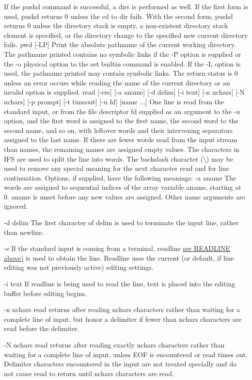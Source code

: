 If the pushd command is successful, a dirs is performed as well. If the first form is used, pushd returns 0 unless the cd to dir fails. With the second form, pushd returns 0 unless the directory stack is empty, a non-existent directory stack element is specified, or the directory change to the specified new current directory fails.
pwd [-LP]
Print the absolute pathname of the current working directory. The pathname printed contains no symbolic links if the -P option is supplied or the -o physical option to the set builtin command is enabled. If the -L option is used, the pathname printed may contain symbolic links. The return status is 0 unless an error occurs while reading the name of the current directory or an invalid option is supplied.
read [-ers] [-a aname] [-d delim] [-i text] [-n nchars] [-N nchars] [-p prompt] [-t timeout] [-u fd] [name ...]
One line is read from the standard input, or from the file descriptor fd supplied as an argument to the -u option, and the first word is assigned to the first name, the second word to the second name, and so on, with leftover words and their intervening separators assigned to the last name. If there are fewer words read from the input stream than names, the remaining names are assigned empty values. The characters in IFS are used to split the line into words. The backslash character (\textbackslash) may be used to remove any special meaning for the next character read and for line continuation. Options, if supplied, have the following meanings:
-a aname
The words are assigned to sequential indices of the array variable aname, starting at 0. aname is unset before any new values are assigned. Other name arguments are ignored.

-d delim
The first character of delim is used to terminate the input line, rather than newline.

-e
If the standard input is coming from a terminal, readline \hyperref[sec:readline]{see READLINE above)} is used to obtain the line. Readline uses the current (or default, if line editing was not previously active) editing settings.

-i text
If readline is being used to read the line, text is placed into the editing buffer before editing begins.

-n nchars
read returns after reading nchars characters rather than waiting for a complete line of input, but honor a delimiter if fewer than nchars characters are read before the delimiter.

-N nchars
read returns after reading exactly nchars characters rather than waiting for a complete line of input, unless EOF is encountered or read times out. Delimiter characters encountered in the input are not treated specially and do not cause read to return until nchars characters are read.

